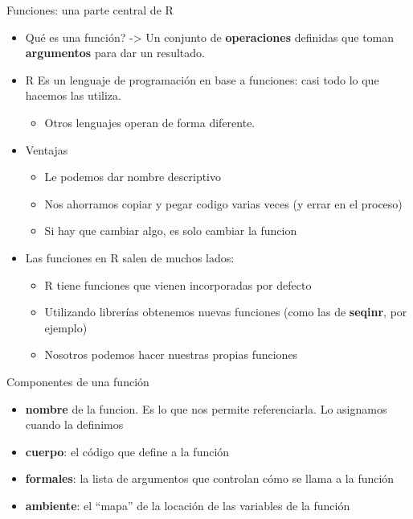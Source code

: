 \documentclass[
  ignorenonframetext,
]{beamer}
\providecommand{\tightlist}{%
  \setlength{\itemsep}{0pt}\setlength{\parskip}{0pt}}
\begin{document}
\begin{frame}{Funciones: una parte central de R}
\protect\hypertarget{funciones-una-parte-central-de-r}{}
\begin{itemize}
\tightlist
\item
  Qué es una función? -\textgreater{} Un conjunto de
  \textbf{operaciones} definidas que toman \textbf{argumentos} para dar
  un resultado.
\item
  R Es un lenguaje de programación en base a funciones: casi todo lo que
  hacemos las utiliza.

  \begin{itemize}
  \tightlist
  \item
    Otros lenguajes operan de forma diferente.
  \end{itemize}
\item
  Ventajas

  \begin{itemize}
  \tightlist
  \item
    Le podemos dar nombre descriptivo
  \item
    Nos ahorramos copiar y pegar codigo varias veces (y errar en el
    proceso)
  \item
    Si hay que cambiar algo, es solo cambiar la funcion
  \end{itemize}
\item
  Las funciones en R salen de muchos lados:

  \begin{itemize}
  \tightlist
  \item
    R tiene funciones que vienen incorporadas por defecto
  \item
    Utilizando librerías obtenemos nuevas funciones (como las de
    \textbf{seqinr}, por ejemplo)
  \item
    Nosotros podemos hacer nuestras propias funciones
  \end{itemize}
\end{itemize}
\end{frame}

\begin{frame}{Componentes de una función}
\protect\hypertarget{componentes-de-una-funciuxf3n}{}
\begin{itemize}
\tightlist
\item
  \textbf{nombre} de la funcion. Es lo que nos permite referenciarla. Lo
  asignamos cuando la definimos
\item
  \textbf{cuerpo}: el código que define a la función
\item
  \textbf{formales}: la lista de argumentos que controlan cómo se llama
  a la función
\item
  \textbf{ambiente}: el ``mapa'' de la locación de las variables de la
  función
\end{itemize}
\end{frame}
\end{document}
